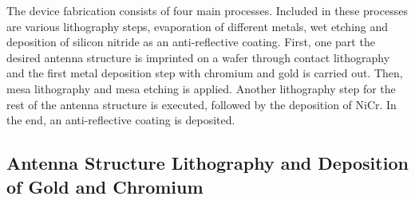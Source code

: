 The device fabrication consists of four main processes. Included in these processes are various lithography steps, evaporation of different metals, wet etching and deposition of silicon nitride as an anti-reflective coating. First, one part the desired antenna structure is imprinted on a wafer through contact lithography and the first metal deposition step with chromium and gold is carried out. Then, mesa lithography and mesa etching is applied. Another lithography step for the rest of the antenna structure is executed, followed by the deposition of NiCr. In the end, an anti-reflective coating is deposited. 

\subsection{Antenna Structure Lithography and Deposition of Gold and Chromium}

